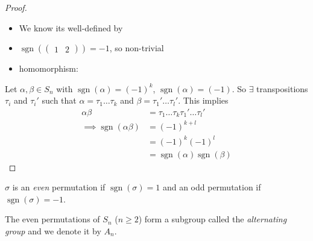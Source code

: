 \begin{proof}
~

\begin{itemize}
\item
  We know its well-defined by 
\item
  \(\operatorname{sgn}\left( \begin{pmatrix}1 & 2\end{pmatrix} \right) = -1\), so non-trivial
\item
  homomorphism:
\end{itemize}

Let \(\alpha, \beta \in S_n\) with \(\operatorname{sgn} (\alpha) = (-1)^k\), \(\operatorname{sgn} (\alpha) = (-1)\).
So \(\exists\) transpositions \(\tau_i\) and \(\tau_i'\) such that \(\alpha = \tau_1 \ldots \tau_k\) and \(\beta = \tau_1' \ldots \tau_l'\).
This implies
\begin{align*}
    \alpha \beta &= \tau_1 \ldots \tau_k \tau_1' \ldots \tau_l' \\
    \implies \operatorname{sgn}(\alpha \beta) &= (-1)^{k + l} \\
    &= (-1)^k (-1)^l \\
    &= \operatorname{sgn}(\alpha) \operatorname{sgn}(\beta)
\end{align*}
\end{proof}

\begin{definition}
\protect\hypertarget{def:eleven}{}\label{def:eleven}
\(\sigma\) is an \emph{even} permutation if \(\operatorname{sgn}(\sigma) = 1\) and an odd permutation if \(\operatorname{sgn}(\sigma) = -1\).
\end{definition}

\begin{corollary}
The even permutations of \(S_n\) (\(n \geq 2\)) form a subgroup called the \emph{alternating group} and we denote it by \(A_n\).
\end{corollary}

